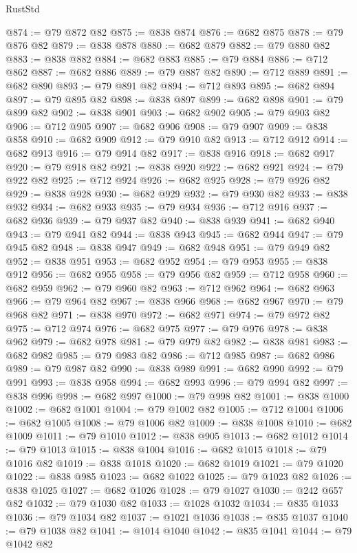 \begin{lexlean}{RustStd}
\begin{coremodule}
@874 := @79 @872 @82
@875 := @838 @874
@876 := @682 @875
@878 := @79 @876 @82
@879 := @838 @878
@880 := @682 @879
@882 := @79 @880 @82
@883 := @838 @882
@884 := @682 @883
@885 := @79 @884
@886 := @712 @862
@887 := @682 @886
@889 := @79 @887 @82
@890 := @712 @889
@891 := @682 @890
@893 := @79 @891 @82
@894 := @712 @893
@895 := @682 @894
@897 := @79 @895 @82
@898 := @838 @897
@899 := @682 @898
@901 := @79 @899 @82
@902 := @838 @901
@903 := @682 @902
@905 := @79 @903 @82
@906 := @712 @905
@907 := @682 @906
@908 := @79 @907
@909 := @838 @858
@910 := @682 @909
@912 := @79 @910 @82
@913 := @712 @912
@914 := @682 @913
@916 := @79 @914 @82
@917 := @838 @916
@918 := @682 @917
@920 := @79 @918 @82
@921 := @838 @920
@922 := @682 @921
@924 := @79 @922 @82
@925 := @712 @924
@926 := @682 @925
@928 := @79 @926 @82
@929 := @838 @928
@930 := @682 @929
@932 := @79 @930 @82
@933 := @838 @932
@934 := @682 @933
@935 := @79 @934
@936 := @712 @916
@937 := @682 @936
@939 := @79 @937 @82
@940 := @838 @939
@941 := @682 @940
@943 := @79 @941 @82
@944 := @838 @943
@945 := @682 @944
@947 := @79 @945 @82
@948 := @838 @947
@949 := @682 @948
@951 := @79 @949 @82
@952 := @838 @951
@953 := @682 @952
@954 := @79 @953
@955 := @838 @912
@956 := @682 @955
@958 := @79 @956 @82
@959 := @712 @958
@960 := @682 @959
@962 := @79 @960 @82
@963 := @712 @962
@964 := @682 @963
@966 := @79 @964 @82
@967 := @838 @966
@968 := @682 @967
@970 := @79 @968 @82
@971 := @838 @970
@972 := @682 @971
@974 := @79 @972 @82
@975 := @712 @974
@976 := @682 @975
@977 := @79 @976
@978 := @838 @962
@979 := @682 @978
@981 := @79 @979 @82
@982 := @838 @981
@983 := @682 @982
@985 := @79 @983 @82
@986 := @712 @985
@987 := @682 @986
@989 := @79 @987 @82
@990 := @838 @989
@991 := @682 @990
@992 := @79 @991
@993 := @838 @958
@994 := @682 @993
@996 := @79 @994 @82
@997 := @838 @996
@998 := @682 @997
@1000 := @79 @998 @82
@1001 := @838 @1000
@1002 := @682 @1001
@1004 := @79 @1002 @82
@1005 := @712 @1004
@1006 := @682 @1005
@1008 := @79 @1006 @82
@1009 := @838 @1008
@1010 := @682 @1009
@1011 := @79 @1010
@1012 := @838 @905
@1013 := @682 @1012
@1014 := @79 @1013
@1015 := @838 @1004
@1016 := @682 @1015
@1018 := @79 @1016 @82
@1019 := @838 @1018
@1020 := @682 @1019
@1021 := @79 @1020
@1022 := @838 @985
@1023 := @682 @1022
@1025 := @79 @1023 @82
@1026 := @838 @1025
@1027 := @682 @1026
@1028 := @79 @1027
@1030 := @242 @657 @82
@1032 := @79 @1030 @82
@1033 := @1028 @1032
@1034 := @835 @1033
@1036 := @79 @1034 @82
@1037 := @1021 @1036
@1038 := @835 @1037
@1040 := @79 @1038 @82
@1041 := @1014 @1040
@1042 := @835 @1041
@1044 := @79 @1042 @82

\end{coremodule}
\end{lexlean}

